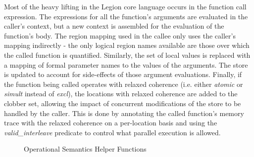 Most of the heavy lifting in the Legion core language occurs in the function call expression.
The expressions for all the function's arguments are evaluated in the caller's context, but a
new context is assembled for the evaluation of the function's body.  The region mapping used
in the callee only uses the caller's mapping indirectly - the only logical region names available
are those over which the called function is quantified.  Similarly, the set of local values is
replaced with a mapping of formal parameter names to the values of the arguments.  The store
is updated to account for side-effects of those argument evaluations.  Finally, if the function
being called operates with relaxed coherence (i.e. either {\em atomic} or {\em simult} instead of
{\em excl}), the locations with relaxed coherence are added to the clobber set, allowing the
impact of concurrent modifications of the store to be handled by the caller.  This is done by
annotating the called function's memory trace with the relaxed coherence on a per-location basis
and using the {\em valid\_interleave} predicate to control what parallel execution is allowed.

\begin{figure*}
\caption{Operational Semantics Helper Functions}
\label{fig:opsemfns}
\end{figure*}

